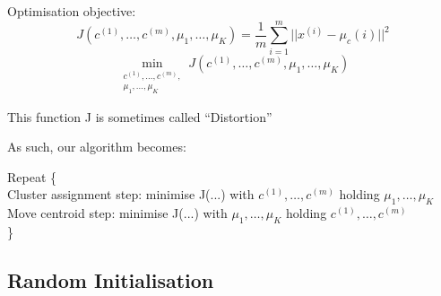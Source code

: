 \documentclass{scrartcl}
\begin{document}
Optimisation objective: \[
J(c^{(1)}, \dots, c^{(m)}, \mu_1, \dots, \mu_K) = \frac{1}{m} \sum
\limits_{i=1}^m || x^{(i)} - \mu_c(i) ||^2
\]
\[ \min \limits_{  \begin{array}{l}
c^{(1)}, \dots, c^{(m)}, \\
 \mu_1, \dots, \mu_K    
  \end{array}} J(c^{(1)}, \dots, c^{(m)}, \mu_1, \dots, \mu_K) \]

This function J is sometimes called ``Distortion''

As such, our algorithm becomes:
\begin{tabbing}
Repeat \{    \\
Cluster assignment step: minimise J(...) with $c^{(1)}, \dots,
c^{(m)}$ holding $\mu_1, \dots, \mu_K$  \\

Move centroid step: minimise J(...) with  $\mu_1, \dots, \mu_K$
holding  $c^{(1)}, \dots, c^{(m)}$ \\
\}
\end{tabbing}

\subsection{Random Initialisation}
\label{sec:13-4}
\end{document}
